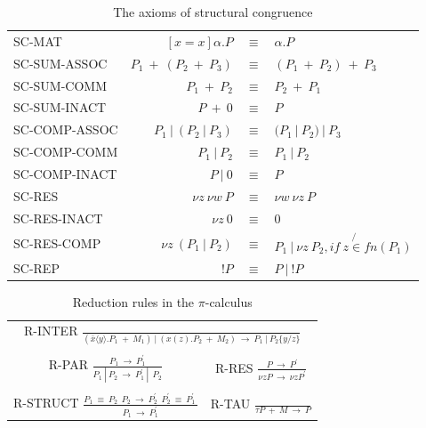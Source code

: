 \begin{table}[h]
  \begin{center}
  \begin{tabular}{ l r c l }
  SC-MAT					&$[x = x] \alpha.P$			&$\equiv$&$\alpha.P$\\
  SC-SUM-ASSOC		&$P_1\ +\ (P_2\ +\ P_3)$	&$\equiv$&$(P_1\ +\ P_2)\ +\ P_3$\\
  SC-SUM-COMM		&$P_1\ +\ P_2$				&$\equiv$&$P_2\ +\ P_1$\\
  SC-SUM-INACT		&$P\ +\ 0$					&$\equiv$&$P$\\
  SC-COMP-ASSOC	&$P_1\ |\ (P_2\ |\ P_3)$	&$\equiv$&$(P_1\ |\ P_2)\ |\ P_3$\\
  SC-COMP-COMM		&$P_1\ |\ P_2$				&$\equiv$&$P_1\ |\ P_2$\\
  SC-COMP-INACT		&$P\ |\ 0$						&$\equiv$&$P$\\
  SC-RES					&$\nu z\ \nu w\ P$			&$\equiv$&$\nu w\ \nu z\ P$\\
  SC-RES-INACT		&$\nu z\ 0$					&$\equiv$&$0$\\
  SC-RES-COMP		&$\nu z\ (P_1\ |\ P_2)$		&$\equiv$&$P_1\ |\  \nu z\ P_2, if\ z\not{\in} fn(P_1)$\\
  SC-REP					&$!P$							&$\equiv$&$P\ |\ !P$\\
  \end{tabular}
  \end{center}
  \caption{The axioms of structural congruence}
  \label{pi-str-cong}
\end{table}

\vspace{20 mm}

\begin{table} [H]
  \begin{center}

  \begin{tabular}{ c c }
\multicolumn{2}{c}{R-INTER $\frac{}{(\bar{x}\langle y \rangle.P_1\ +\ M_1)\ |\ (x(z).P_2\ +\ M_2)\ \longrightarrow\ P_1\ |\ P_2\{y/z\}}$}\\
\\
R-PAR $\frac{P_1\ \longrightarrow\ P^{'}_{1}}{P_1\ |\ P_2\ \longrightarrow\ P^{'}_{1}\ |\ \ P_{2}}$ & 
R-RES $\frac {P\ \longrightarrow\ P^{'}} {\nu z P\ \longrightarrow\ \nu z P^{'}} $\\
\\
R-STRUCT $\frac {P_1\ \equiv\ P_2\ \ P_2\ \longrightarrow\ P_2^{'}\ \ P_2^{'}\ \equiv\ P_1^{'}\ } {P_1\ \longrightarrow\ P^{'}_{1}} $&
R-TAU $\frac {} {\tau  P\ + \ M\ \longrightarrow\ P}$
  \end{tabular}
  \end{center}
  \caption{Reduction rules in the $\pi$-calculus}
  \label{pi-str-red}
\end{table}

